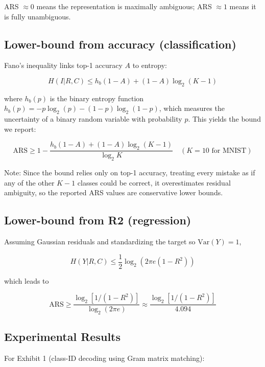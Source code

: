 \documentclass[11pt]{article}
\begin{document}
ARS $\approx 0$ means the representation is maximally ambiguous; ARS $\approx 1$ means it is fully unambiguous.

\subsection{Lower-bound from accuracy (classification)}

Fano's inequality links top-1 accuracy $A$ to entropy:

\begin{equation}
H(I|R,C) \leq h_b(1-A) + (1-A)\log_2(K-1)
\end{equation}

where $h_b(p)$ is the binary entropy function $h_b(p) = -p\log_2(p) - (1-p)\log_2(1-p)$, which measures the uncertainty of a binary random variable with probability $p$. This yields the bound we report:

\begin{equation}
\boxed{
\text{ARS} \geq 1 - \frac{h_b(1-A) + (1-A)\log_2(K-1)}{\log_2 K}
}
\quad (K=10 \text{ for MNIST})
\end{equation}

Note: Since the bound relies only on top-1 accuracy, treating every mistake as if any of the other $K-1$ classes could be correct, it overestimates residual ambiguity, so the reported ARS values are conservative lower bounds.

\subsection{Lower-bound from R2 (regression)}

Assuming Gaussian residuals and standardizing the target so $\text{Var}(Y) = 1$,

\begin{equation}
H(Y|R,C) \leq \frac{1}{2}\log_2(2\pi e(1-R^2))
\end{equation}

which leads to

\begin{equation}
\boxed{
\text{ARS} \geq \frac{\log_2[1/(1-R^2)]}{\log_2(2\pi e)}
} \approx \frac{\log_2[1/(1-R^2)]}{4.094}
\end{equation}

\subsection{Experimental Results}

For Exhibit 1 (class-ID decoding using Gram matrix matching):
\end{document}
